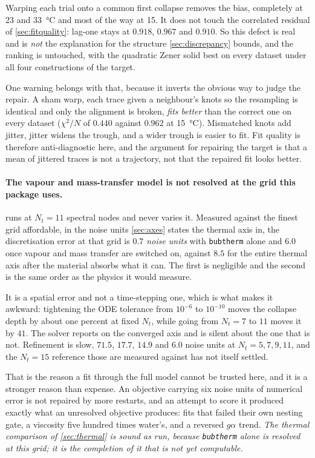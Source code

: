 \documentclass[10pt]{article}
\begin{document}
Warping each trial onto a common first collapse removes the bias, completely at \SI{23}{} and
\SI{33}{\celsius} and most of the way at \SI{15}{}. It does not touch the correlated residual of
\cref{sec:fitquality}: lag-one stays at $0.918$, $0.967$ and $0.910$. So this defect is real and
is \emph{not} the explanation for the structure \cref{sec:discrepancy} bounds, and the ranking is
untouched, with the quadratic Zener solid best on every dataset under all four constructions of
the target.

One warning belongs with that, because it inverts the obvious way to judge the repair. A sham
warp, each trace given a neighbour's knots so the resampling is identical and only the alignment
is broken, \emph{fits better} than the correct one on every dataset ($\chi^2/N$ of $0.440$
against $0.962$ at \SI{15}{\celsius}). Mismatched knots add jitter, jitter widens the trough, and
a wider trough is easier to fit. Fit quality is therefore anti-diagnostic here, and the argument
for repairing the target is that a mean of jittered traces is not a trajectory, not that the
repaired fit looks better.

\paragraph{The vapour and mass-transfer model is not resolved at the grid this package uses.}
 runs at $N_t = 11$ spectral nodes and never varies it. Measured against the
finest grid affordable, in the noise units \cref{sec:axes} states the thermal axis in, the
discretisation error at that grid is \emph{$0.7$ noise units} with \texttt{bubtherm} alone and
\emph{$6.0$} once vapour and mass transfer are switched on, against $8.5$ for the entire thermal
axis after the material absorbs what it can. The first is negligible and the second is the same
order as the physics it would measure.

It is a spatial error and not a time-stepping one, which is what makes it awkward: tightening the
ODE tolerance from $10^{-6}$ to $10^{-10}$ moves the collapse depth by about one percent at fixed
$N_t$, while going from $N_t = 7$ to $11$ moves it by $41$. The solver reports on the converged
axis and is silent about the one that is not. Refinement is slow, $71.5$, $17.7$, $14.9$ and
$6.0$ noise units at $N_t = 5, 7, 9, 11$, and the $N_t = 15$ reference those are measured against
has not itself settled.

That is the reason a fit through the full model cannot be trusted here, and it is a stronger
reason than expense. An objective carrying six noise units of numerical error is not repaired by
more restarts, and an attempt to score it produced exactly what an unresolved objective produces:
fits that failed their own nesting gate, a viscosity five hundred times water's, and a reversed
$g\alpha$ trend. \emph{The thermal comparison of \cref{sec:thermal} is sound as run, because
\texttt{bubtherm} alone is resolved at this grid; it is the completion of it that is not yet
computable.}
\end{document}
